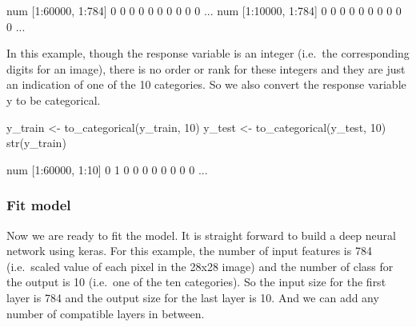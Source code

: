 \documentclass[
  12pt,
]{krantz}
\makeatletter
\newenvironment{Shaded}{\begin{snugshade}}{\end{snugshade}}
\newcommand{\DecValTok}[1]{\textcolor[rgb]{0.06,0.06,0.06}{#1}}
\newcommand{\FunctionTok}[1]{\textcolor[rgb]{0,0,0}{#1}}
\newcommand{\NormalTok}[1]{#1}
\newcommand{\OtherTok}[1]{\textcolor[rgb]{0.37,0.37,0.37}{#1}}
\newenvironment{kframe}{%
\medskip{}
\setlength{\fboxsep}{.8em}
 \def\at@end@of@kframe{}%
 \ifinner\ifhmode%
  \def\at@end@of@kframe{\end{minipage}}%
  \begin{minipage}{\columnwidth}%
 \fi\fi%
 \def\FrameCommand##1{\hskip\@totalleftmargin \hskip-\fboxsep
 \colorbox{shadecolor}{##1}\hskip-\fboxsep
     \hskip-\linewidth \hskip-\@totalleftmargin \hskip\columnwidth}%
 \MakeFramed {\advance\hsize-\width
   \@totalleftmargin\z@ \linewidth\hsize
   \@setminipage}}%
 {\par\unskip\endMakeFramed%
 \at@end@of@kframe}
\renewenvironment{Shaded}{\begin{kframe}}{\end{kframe}}
\makeatother
\begin{document}
\begin{Shaded}
\begin{Highlighting}[]
\NormalTok{num [1:60000, 1:784] 0 0 0 0 0 0 0 0 0 0 ...}
\NormalTok{num [1:10000, 1:784] 0 0 0 0 0 0 0 0 0 0 ...}
\end{Highlighting}
\end{Shaded}

In this example, though the response variable is an integer (i.e.~the corresponding digits for an image), there is no order or rank for these integers and they are just an indication of one of the 10 categories. So we also convert the response variable y to be categorical.

\begin{Shaded}
\begin{Highlighting}[]
\NormalTok{y\_train }\OtherTok{\textless{}{-}} \FunctionTok{to\_categorical}\NormalTok{(y\_train, }\DecValTok{10}\NormalTok{)}
\NormalTok{y\_test }\OtherTok{\textless{}{-}} \FunctionTok{to\_categorical}\NormalTok{(y\_test, }\DecValTok{10}\NormalTok{)}
\FunctionTok{str}\NormalTok{(y\_train)}
\end{Highlighting}
\end{Shaded}

\begin{Shaded}
\begin{Highlighting}[]
\NormalTok{num [1:60000, 1:10] 0 1 0 0 0 0 0 0 0 0 ...}
\end{Highlighting}
\end{Shaded}

\hypertarget{fit-model}{%
\subsubsection{Fit model}\label{fit-model}}

Now we are ready to fit the model. It is straight forward to build a deep neural network using keras. For this example, the number of input features is 784 (i.e.~scaled value of each pixel in the 28x28 image) and the number of class for the output is 10 (i.e.~one of the ten categories). So the input size for the first layer is 784 and the output size for the last layer is 10. And we can add any number of compatible layers in between.
\end{document}
